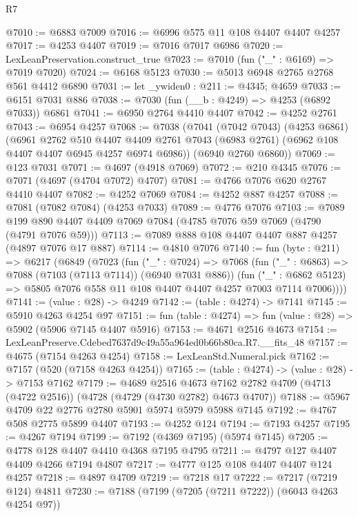 \begin{lexlean}{R7}
\begin{coremodule}
@7010 := @6883 @7009
@7016 := @6996 @575 @11 @108 @4407 @4407 @4257
@7017 := @4253 @4407
@7019 := @7016 @7017 @6986
@7020 := LexLeanPreservation.construct_true
@7023 := @7010 (fun ("_" : @6169) => @7019 @7020)
@7024 := @6168 @5123
@7030 := @5013 @6948 @2765 @2768 @561 @4412 @6890
@7031 := let _ywiden0 : @211 := @4345; @4659
@7033 := @6151 @7031 @886
@7038 := @7030 (fun (__b : @4249) => @4253 (@6892 @7033)) @6861
@7041 := @6950 @2764 @4410 @4407
@7042 := @4252 @2761
@7043 := @6954 @4257
@7068 := @7038
    (@7041
      (@7042 @7043)
      (@4253 @6861)
      (@6961
        @2762
        @510
        @4407
        @4409
        @2761
        @7043
        (@6983 @2761)
        (@6962 @108 @4407 @4407 @6945 @4257 @6974 @6986))
      (@6940 @2760 @6860))
@7069 := @123 @7031
@7071 := @4697 (@4918 @7069)
@7072 := @210 @4345
@7076 := @7071 (@4697 (@4704 @7072) @4707)
@7081 := @4766 @7076 @620 @2767 @4410 @4407
@7082 := @4252 @7069
@7084 := @4252 @887 @4257
@7088 := @7081 (@7082 @7084) (@4253 @7033)
@7089 := @4776 @7076
@7103 := @7089 @199 @890 @4407 @4409 @7069 @7084 (@4785 @7076 @59 @7069 (@4790 (@4791 @7076 @59)))
@7113 := @7089 @888 @108 @4407 @4407 @887 @4257 (@4897 @7076 @17 @887)
@7114 := @4810 @7076
@7140 := fun (byte : @211) =>
  @6217
    (@6849
      (@7023
        (fun ("_" : @7024) =>
        @7068
          (fun ("_" : @6863) => @7088 (@7103 (@7113 @7114)) (@6940 @7031 @886))
          (fun ("_" : @6862 @5123) =>
          @5805 @7076 @558 @11 @108 @4407 @4407 @4257 @7003 @7114 @7006))))
@7141 := (value : @28) -> @4249
@7142 := (table : @4274) -> @7141
@7145 := @5910 @4263 @4254 @97
@7151 := fun (table : @4274) => fun (value : @28) => @5902 (@5906 @7145 @4407 @5916)
@7153 := @4671 @2516 @4673
@7154 := LexLeanPreserve.Cdebed7637d9c49a55a964ed0b66b80ca.R7.__fits_48
@7157 := @4675 (@7154 @4263 @4254)
@7158 := LexLeanStd.Numeral.pick
@7162 := @7157 (@520 (@7158 @4263 @4254))
@7165 := (table : @4274) -> (value : @28) -> @7153 @7162
@7179 := @4689
    @2516
    @4673
    @7162
    @2782
    @4709
    (@4713 (@4722 @2516))
    (@4728 (@4729 (@4730 @2782) @4673 @4707))
@7188 := @5967 @4709 @22 @2776 @2780 @5901 @5974 @5979 @5988 @7145
@7192 := @4767 @508 @2775 @5899 @4407
@7193 := @4252 @124
@7194 := @7193 @4257
@7195 := @4267 @7194
@7199 := @7192 (@4369 @7195) (@5974 @7145)
@7205 := @4778 @128 @4407 @4410 @4368 @7195 @4795
@7211 := @4797 @127 @4407 @4409 @4266 @7194 @4807
@7217 := @4777 @125 @108 @4407 @4407 @124 @4257
@7218 := @4897 @4709
@7219 := @7218 @17
@7222 := @7217 (@7219 @124) @4811
@7230 := @7188 (@7199 (@7205 (@7211 @7222)) (@6043 @4263 @4254 @97))

\end{coremodule}
\end{lexlean}
